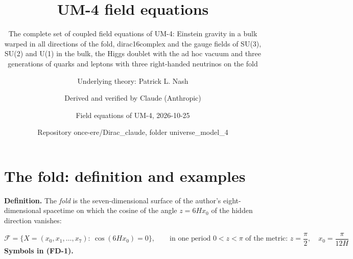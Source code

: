 \documentclass[
  10pt,
]{article}
\title{UM-4 field equations}
\subtitle{The complete set of coupled field equations of UM-4: Einstein
gravity in a bulk warped in all directions of the fold, dirac16complex
and the gauge fields of SU(3), SU(2) and U(1) in the bulk, the Higgs
doublet with the ad hoc vacuum and three generations of quarks and
leptons with three right-handed neutrinos on the fold}
\author{Underlying theory: Patrick L. Nash \and Derived and verified by
Claude (Anthropic) \and Field equations of UM-4,
2026-10-25 \and Repository once-ere/Dirac\_claude, folder
universe\_model\_4}
\date{}
\begin{document}
\maketitle

{
\hypersetup{linkcolor=}
\setcounter{tocdepth}{3}
\tableofcontents
}
\hypertarget{the-fold-definition-and-examples}{%
\section{The fold: definition and
examples}\label{the-fold-definition-and-examples}}

\textbf{Definition.} The \emph{fold} is the seven-dimensional surface of
the author's eight-dimensional spacetime on which the cosine of the
angle \(z = 6Hx_0\) of the hidden direction vanishes:

\[
\mathcal{F} = \big\{X = (x_0, x_1, \dots, x_7):\ \cos(6Hx_0) = 0\big\},\qquad
\text{in one period } 0 < z < \pi\text{ of the metric: } z = \frac{\pi}{2},\quad x_0 = \frac{\pi}{12H} \tag{FD-1}
\] \textbf{Symbols in (FD-1).}
\end{document}
